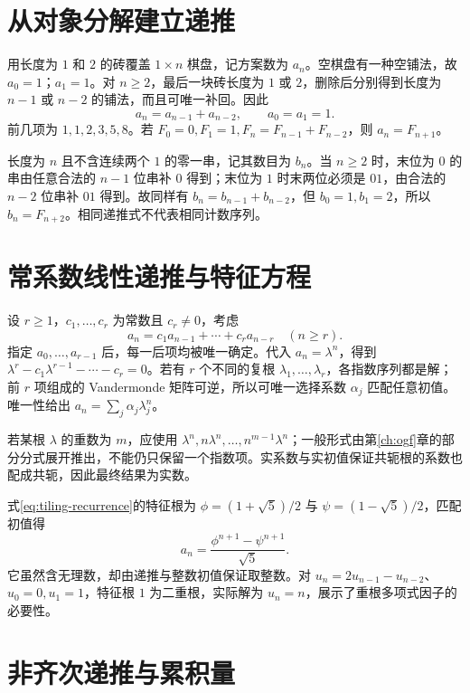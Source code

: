 \documentclass[UTF8,12pt,a4paper,fontset=fandol]{ctexbook}
\begin{document}
\section{从对象分解建立递推}

用长度为 $1$ 和 $2$ 的砖覆盖 $1\times n$ 棋盘，记方案数为 $a_n$。空棋盘有一种空铺法，故 $a_0=1$；$a_1=1$。对 $n\ge2$，最后一块砖长度为 $1$ 或 $2$，删除后分别得到长度为 $n-1$ 或 $n-2$ 的铺法，而且可唯一补回。因此
\begin{equation}
  a_n=a_{n-1}+a_{n-2},\qquad a_0=a_1=1.
  \label{eq:tiling-recurrence}
\end{equation}
前几项为 $1,1,2,3,5,8$。若 $F_0=0,F_1=1,F_n=F_{n-1}+F_{n-2}$，则 $a_n=F_{n+1}$。

长度为 $n$ 且不含连续两个 $1$ 的零一串，记其数目为 $b_n$。当 $n\ge2$ 时，末位为 $0$ 的串由任意合法的 $n-1$ 位串补 $0$ 得到；末位为 $1$ 时末两位必须是 $01$，由合法的 $n-2$ 位串补 $01$ 得到。故同样有 $b_n=b_{n-1}+b_{n-2}$，但 $b_0=1,b_1=2$，所以 $b_n=F_{n+2}$。相同递推式不代表相同计数序列。

\section{常系数线性递推与特征方程}

设 $r\ge1$，$c_1,\ldots,c_r$ 为常数且 $c_r\ne0$，考虑
\[
  a_n=c_1a_{n-1}+\cdots+c_ra_{n-r}\quad(n\ge r).
\]
指定 $a_0,\ldots,a_{r-1}$ 后，每一后项均被唯一确定。代入 $a_n=\lambda^n$，得到 $\lambda^r-c_1\lambda^{r-1}-\cdots-c_r=0$。若有 $r$ 个不同的复根 $\lambda_1,\ldots,\lambda_r$，各指数序列都是解；前 $r$ 项组成的 Vandermonde 矩阵可逆，所以可唯一选择系数 $\alpha_j$ 匹配任意初值。唯一性给出 $a_n=\sum_j\alpha_j\lambda_j^n$。

若某根 $\lambda$ 的重数为 $m$，应使用 $\lambda^n,n\lambda^n,\ldots,n^{m-1}\lambda^n$；一般形式由第\ref{ch:ogf}章的部分分式展开推出，不能仍只保留一个指数项。实系数与实初值保证共轭根的系数也配成共轭，因此最终结果为实数。

\begin{example}
式\eqref{eq:tiling-recurrence}的特征根为 $\phi=(1+\sqrt5)/2$ 与 $\psi=(1-\sqrt5)/2$，匹配初值得
\[
  a_n=\frac{\phi^{n+1}-\psi^{n+1}}{\sqrt5}.
\]
它虽然含无理数，却由递推与整数初值保证取整数。对 $u_n=2u_{n-1}-u_{n-2}$、$u_0=0,u_1=1$，特征根 $1$ 为二重根，实际解为 $u_n=n$，展示了重根多项式因子的必要性。
\end{example}

\section{非齐次递推与累积量}
\end{document}
